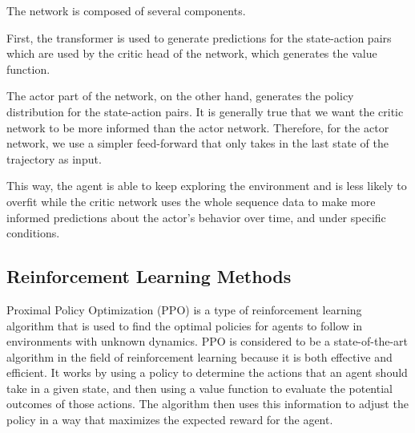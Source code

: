 The network is composed of several components.

First, the transformer is used to generate predictions for the state-action pairs which are used
by the critic head of the network, which generates the value function.

The actor part of the network, on the other hand, generates the policy distribution for the state-action pairs.
It is generally true that we want the critic network to be more informed than the actor network.
Therefore, for the actor network, we use a simpler feed-forward that only takes in the last state of the trajectory as input.

This way, the agent is able to keep exploring the environment and is less likely to overfit while the
critic network uses the whole sequence data to make more informed predictions about the actor's
behavior over time, and under specific conditions.


\subsection{Reinforcement Learning Methods}
\label{subsec:reinf-learning-methods}


Proximal Policy Optimization (PPO) \cite{schulman2017proximal} is a type of reinforcement learning algorithm
that is used to find the optimal policies for agents to follow in environments with unknown dynamics.
PPO is considered to be a state-of-the-art algorithm in the field of reinforcement learning because it is both effective and efficient.
It works by using a policy to determine the actions that an agent should take in a given state,
and then using a value function to evaluate the potential outcomes of those actions.
The algorithm then uses this information to adjust the policy in a way that maximizes the expected reward for the agent.

